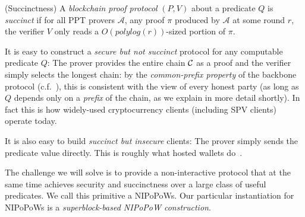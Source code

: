 \begin{definition}{(Succinctness)}
A \emph{blockchain proof protocol} $(P, V)$ about a predicate $Q$ is
\emph{succinct} if for all PPT provers $\mathcal{A}$, any proof $\pi$ produced
by $\mathcal{A}$ at some round $r$, the verifier $V$ only reads a
$O(polylog(r))$-sized portion of $\pi$.
\end{definition}

It is easy to construct a \emph{secure but not succinct} protocol for any
computable predicate $Q$: The prover provides the entire chain $\mathcal{C}$ as a
proof and the verifier simply selects the longest chain: by the
\emph{common-prefix property} of the backbone protocol (c.f.~\cite{backbone}),
this is consistent with the view of every honest party (as long as $Q$ depends
only on a \emph{prefix} of the chain, as we explain in more detail shortly). In
fact this is how widely-used cryptocurrency clients (including SPV clients)
operate today.

It is also easy to build \emph{succinct but insecure} clients: The prover simply
sends the predicate value directly. This is roughly what hosted wallets
do~\cite{sok}.

The challenge we will solve is to provide a non-interactive protocol that at the
same time achieves security and succinctness over a large class of useful
predicates. We call this primitive a NIPoPoWs. Our particular instantiation for
NIPoPoWs is a \emph{superblock-based NIPoPoW construction}.
